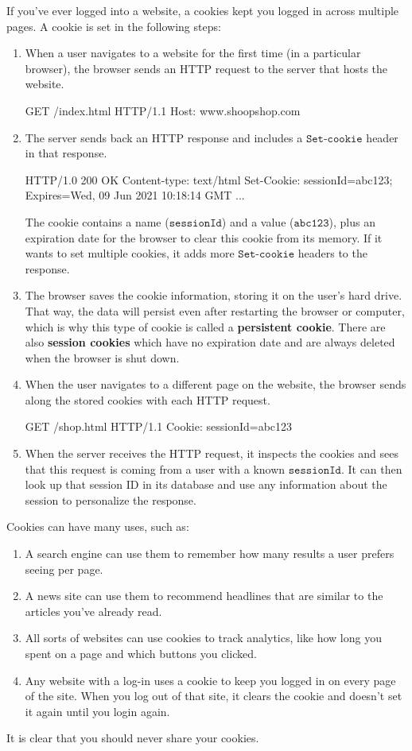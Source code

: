 \documentclass[a4paper, 12pt]{report}
\theoremstyle{remark}
\theoremstyle{definition}
\begin{document}
If you've ever logged into a website, a cookies kept you logged in across multiple pages. A cookie is set in the following steps: 
\begin{enumerate}
    \item When a user navigates to a website for the first time (in a particular browser), the browser sends an HTTP request to the server that hosts the website. 
    \begin{python}
    GET /index.html HTTP/1.1
    Host: www.shoopshop.com
    \end{python}
    \item The server sends back an HTTP response and includes a $\texttt{Set-cookie}$ header in that response. 
    \begin{python}
    HTTP/1.0 200 OK
    Content-type: text/html
    Set-Cookie: sessionId=abc123; Expires=Wed, 09 Jun 2021 10:18:14 GMT
    ...
    \end{python}
    The cookie contains a name ($\texttt{sessionId}$) and a value ($\texttt{abc123}$), plus an expiration date for the browser to clear this cookie from its memory. If it wants to set multiple cookies, it adds more $\texttt{Set-cookie}$ headers to the response. 
    \item The browser saves the cookie information, storing it on the user's hard drive. That way, the data will persist even after restarting the browser or computer, which is why this type of cookie is called a \textbf{persistent cookie}. There are also \textbf{session cookies} which have no expiration date and are always deleted when the browser is shut down. 
    \item When the user navigates to a different page on the website, the browser sends along the stored cookies with each HTTP request. 
    \begin{python}
    GET /shop.html HTTP/1.1
    Cookie: sessionId=abc123
    \end{python}
    \item When the server receives the HTTP request, it inspects the cookies and sees that this request is coming from a user with a known $\texttt{sessionId}$. It can then look up that session ID in its database and use any information about the session to personalize the response. 
\end{enumerate}

Cookies can have many uses, such as: 
\begin{enumerate}
    \item A search engine can use them to remember how many results a user prefers seeing per page.
    \item A news site can use them to recommend headlines that are similar to the articles you've already read. 
    \item All sorts of websites can use cookies to track analytics, like how long you spent on a page and which buttons you clicked.
    \item Any website with a log-in uses a cookie to keep you logged in on every page of the site. When you log out of that site, it clears the cookie and doesn't set it again until you login again.
\end{enumerate}
It is clear that you should never share your cookies. 
\end{document}
